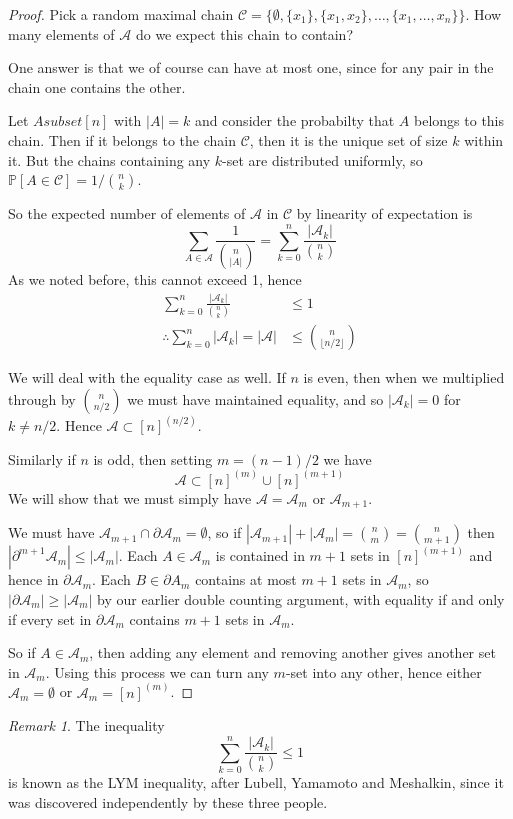 \documentclass[]{article}
\theoremstyle{custhm}
\theoremstyle{cusdef}
\theoremstyle{custhm}
\theoremstyle{custhm}
\theoremstyle{custhm}
\theoremstyle{custhm}
\theoremstyle{cusdef}
\theoremstyle{remark}
\newtheorem*{remark*}{Remark}
\theoremstyle{custhm}
\renewcommand{\P}{\mathbb{P}}
\newcommand{\A}{\mathcal{A}}
\begin{document}
\begin{proof}
Pick a random maximal chain $\mathcal{C} = \{\emptyset, \{x_1\},\{x_1,x_2\},\dots,\{x_1,\dots,x_n\}\}$. How many elements of $\A$ do we expect this chain to contain?

One answer is that we of course can have at most one, since for any pair in the chain one contains the other.

Let $Asubset [n]$ with $|A| = k$ and consider the probabilty that $A$ belongs to this chain. Then if it belongs to the chain $\mathcal{C}$, then it is the unique set of size $k$ within it. But the chains containing any $k$-set are distributed uniformly, so $\P[A\in\mathcal{C}] = 1/{n\choose k}$.

So the expected number of elements of $\A$ in $\mathcal{C}$ by linearity of expectation is
\[
\sum_{A\in\A}\frac{1}{{n\choose |A|}} = \sum_{k=0}^{n} \frac{|\A_k|}{{n\choose k}}
\]
As we noted before, this cannot exceed 1, hence
\begin{align*}
	\sum_{k=0}^{n} \frac{|\A_k|}{\binom{n}{k}}&\le 1\\
	\therefore \sum_{k=0}^{n}|\A_k| = |\A| &\le \binom{n}{\lfloor n/2\rfloor}
\end{align*}

We will deal with the equality case as well. If $n$ is even, then when we multiplied through by $\binom{n}{n/2}$ we must have maintained equality, and so $|\A_k| = 0$ for $k \ne n/2$. Hence $\A \subset [n]^{(n/2)}$.

Similarly if $n$ is odd, then setting $m = (n-1)/2$ we have
\[
\A\subset [n]^{(m)} \cup[n]^{(m+1)}
\]
We will show that we must simply have $\A = \A_m$ or $\A_{m+1}$.

We must have $\A_{m+1}\cap\partial \A_m = \emptyset$, so if $|\A_{m+1}| + |\A_m| = \binom{n}{m} = \binom{n}{m+1}$ then $|\partial^{m+1}\A_m|\le |\A_m|$. Each $A\in \A_m$ is contained in $m+1$ sets in $[n]^{(m+1)}$ and hence in $\partial \A_m$. Each $B\in \partial A_m$ contains at most $m+1$ sets in $\A_m$, so $|\partial \A_m| \ge |\A_m|$ by our earlier double counting argument, with equality if and only if every set in $\partial \A_m$ contains $m+1$ sets in $\A_m$.

So if $A \in \A_m$, then adding any element and removing another gives another set in $\A_m$. Using this process we can turn any $m$-set into any other, hence either $\A_m = \emptyset$ or $\A_m = [n]^{(m)}$.
\end{proof}

\begin{remark*}
The inequality
\[
\sum_{k=0}^{n} \frac{|\A_k|}{\binom{n}{k}} \le 1
\]
is known as the LYM inequality, after Lubell, Yamamoto and Meshalkin, since it was discovered independently by these three people.
\end{remark*}
\end{document}
